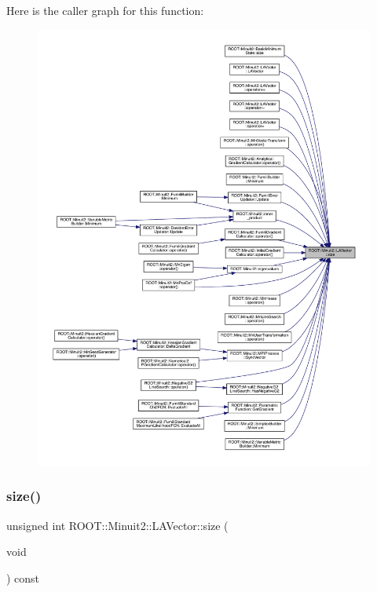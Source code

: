 Here is the caller graph for this function\+:
\nopagebreak
\begin{figure}[H]
\begin{center}
\leavevmode
\includegraphics[width=350pt]{d3/d20/classROOT_1_1Minuit2_1_1LAVector_a145e47ac78c4fcace3209ef477255937_icgraph}
\end{center}
\end{figure}
\mbox{\label{classROOT_1_1Minuit2_1_1LAVector_a145e47ac78c4fcace3209ef477255937}} 
\subsubsection{\texorpdfstring{size()}{size()}\hspace{0.1cm}{\footnotesize\ttfamily [2/3]}}
{\footnotesize\ttfamily unsigned int R\+O\+O\+T\+::\+Minuit2\+::\+L\+A\+Vector\+::size (\begin{DoxyParamCaption}\item[{void}]{ }\end{DoxyParamCaption}) const\hspace{0.3cm}{\ttfamily [inline]}}


